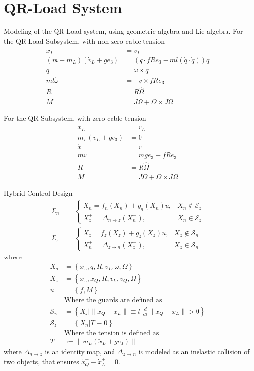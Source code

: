 \section{QR-Load System}
\begin{outline}
	\1 Modeling of the QR-Load system, using geometric algebra and Lie algebra.
	For the QR-Load Subsystem, with non-zero cable tension
	\begin{align}
	\dot{x}_L&=v_L\\
	(m+m_L)(\dot{v}_L+ge_3)&=(q\cdot fRe_3-ml(\dot{q}\cdot\dot{q}))q\\
	\dot{q}&=\omega\times q\\
	ml\dot{\omega}&=-q\times fRe_3\\
	\dot{R}&=R\hat{\Omega}\\
	M&=J\dot{\Omega}+\Omega\times J\Omega
	\end{align} 

	For the QR Subsystem, with zero cable tension
	\begin{align}
	\dot{x}_L&=v_L\\
	m_L(\dot{v}_L+ge_3)&=0\\
	\dot{x}&=v\\
	m\dot{v}&=mge_3-fRe_3\\
	\dot{R}&=R\hat{\Omega}\\
	M&=J\dot{\Omega}+\Omega\times J\Omega
	\end{align} 
	
	\1 Hybrid Control Design	
	\begin{align}
	\Sigma_n&=\begin{cases}
	\dot{X}_n=f_n(X_n)+g_n(X_n)u, & X_n\notin\mathcal{S}_z\\
	X^+_z=\Delta_{n\rightarrow z}(X_n^-), & X_n\in\mathcal{S}_z
	\end{cases}\\	
	\Sigma_z&=\begin{cases}
	\dot{X}_z=f_z(X_z)+g_z(X_z)u, & 	X_z\notin\mathcal{S}_n\\
	X_n^+=\Delta_{z\rightarrow n}(X_z^-),& 	X_z\in\mathcal{S}_n
	\end{cases}	
	\end{align}
	where
	\begin{align}
	X_n&=\left\{x_L,q,R,v_L,\omega,\Omega\right\}\\
	X_z&=\left\{x_L,x_Q,R,v_L,v_Q,\Omega\right\}\\
	u&=\left\{f,M\right\}\\
	&\text{Where the guards are defined as}\\
	\mathcal{S}_n&=\left\{X_z|\parallel x_Q-x_L\parallel\equiv l,\frac{d}{dt}\parallel x_Q-x_L\parallel>0\right\}\\
	\mathcal{S}_z&=\left\{X_n|T\equiv0\right\}\\
	&\text{Where the tension is defined as}\\
	T&:=\parallel m_L(\ddot{x}_L+ge_3)\parallel
	\end{align}
	where $ \Delta_{n\rightarrow z} $ is an identity map, and $ \Delta_{z\rightarrow n} $ is modeled as an inelastic collision of two objects, that ensures $ \dot{x}_Q^+-\dot{x}_L^+=0 $.


\end{outline}
